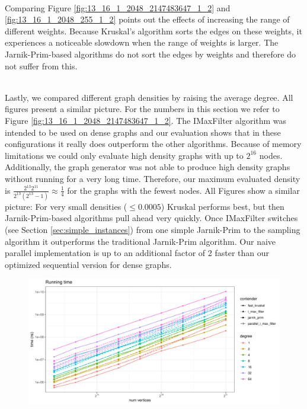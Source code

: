 \documentclass{article}
\begin{document}
\noindent \\
Comparing Figure \ref{fig:13_16_1_2048_2147483647_1_2} and \ref{fig:13_16_1_2048_255_1_2} points out the effects of increasing the range of different weights.
Because Kruskal's algorithm sorts the edges on these weights, it experiences a noticeable slowdown when the range of weights is larger.
The Jarnik-Prim-based algorithms do not sort the edges by weights and therefore do not suffer from this.

\noindent \\
Lastly, we compared different graph densities by raising the average degree.
All figures present a similar picture.
For the numbers in this section we refer to Figure \ref{fig:13_16_1_2048_2147483647_1_2}.
The IMaxFilter algorithm was intended to be used on dense graphs and our evaluation shows that in these configurations it really does outperform the other algorithms.
Because of memory limitations we could only evaluate high density graphs with up to $2^{16}$ nodes.
Additionally, the graph generator was not able to produce high density graphs without running for a very long time.
Therefore, our maximum evaluated density is $\frac{2^{13} 2^{11}}{2^{13} (2^{13}-1)} \approx \frac{1}{4}$ for the graphs with the fewest nodes.
All Figures show a similar picture: For very small densities ($\leq 0.0005$) Kruskal performs best, but then Jarnik-Prim-based algorithms pull ahead very quickly.
Once IMaxFilter switches (see Section \ref{sec:simple_instances}) from one simple Jarnik-Prim to the sampling algorithm it outperforms the traditional Jarnik-Prim algorithm.
Our naive parallel implementation is up to an additional factor of 2 faster than our optimized sequential version for dense graphs.


\begin{figure}[htpb]
  \centering
  \includegraphics[width=\linewidth, page=3]{../plots/13_21_1_64_2147483647_1_2.pdf}
  \caption{}%
  \label{fig:13_21_1_64_2147483647_1_2_p3}
\end{figure}
\end{document}
